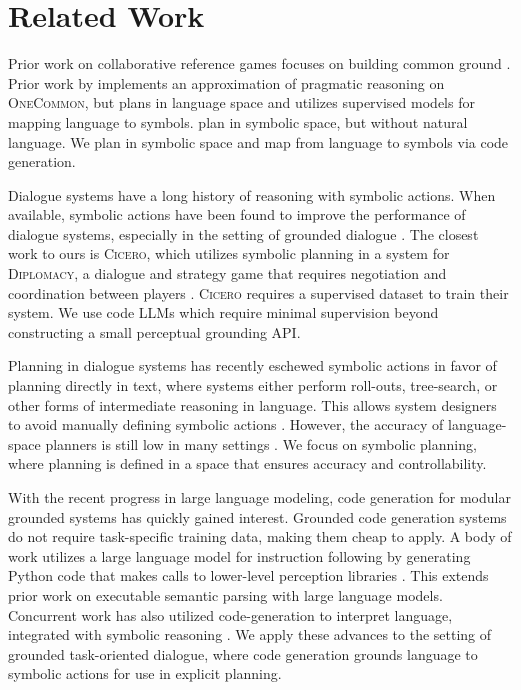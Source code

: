 \documentclass[11pt]{article}
\newcommand{\celine}[1]{{{\textcolor{blue}{(Celine: #1)}}}}
\begin{document}

\section{Related Work}
Prior work on collaborative reference games focuses on building common ground
\citep{mf,pb,pip}.
Prior work by \citet{fried} implements an approximation of pragmatic reasoning on \textsc{OneCommon}, but plans in language space and utilizes supervised models for mapping language to symbols.
\citet{pip} plan in symbolic space, but without natural language.
We plan in symbolic space and map from language to symbols via code generation.

Dialogue systems have a long history of reasoning with symbolic actions.
When available, symbolic actions have been found to improve
the performance of dialogue systems, especially in the setting of grounded dialogue \citep{winograd,young2006pomdp,he2018dnd,sm,cicero}.
The closest work to ours is \textsc{Cicero}, which utilizes symbolic planning in a system for \textsc{Diplomacy},
a dialogue and strategy game that requires negotiation and coordination between players \citep{cicero}.
\textsc{Cicero} requires a supervised dataset to train their system.
We use code LLMs which require minimal supervision beyond constructing a small perceptual grounding API.

Planning in dialogue systems has recently eschewed symbolic actions in favor of
planning directly in text, 
where systems either perform roll-outs, tree-search, or other forms of intermediate reasoning in language.
This allows system designers to avoid manually defining symbolic actions \citep{yarats2017rollout,jang2020bapomdp,gandhi2023strategic}.
However, the accuracy of language-space planners is still low in many settings \citep{fried,valmeekam2023planning}.
We focus on symbolic planning, where planning is defined in a space that ensures accuracy and controllability.

With the recent progress in large language modeling,
code generation for modular grounded systems has quickly gained interest.
Grounded code generation systems do not require task-specific training data, 
making them cheap to apply.
A body of work utilizes a large language model for instruction following
by generating Python code that makes calls to lower-level perception libraries
\citep{codeaspolicies2022,vipergpt,gupta2022visual,gao2023pal}.
This extends prior work on executable semantic parsing \citep{liang2016learning,johnson2017inferring,cheng2018learning} with large language models.
Concurrent work has also utilized code-generation to interpret language, integrated with symbolic reasoning \citep{wong2023word}.
We apply these advances to the setting of grounded task-oriented dialogue,
where code generation grounds language to symbolic actions for use in explicit planning.
\end{document}
